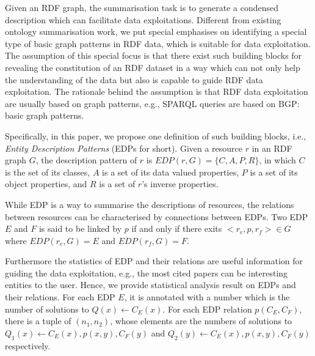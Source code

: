 \vspace{-2mm}
Given an RDF graph, the summarisation task is to generate a condensed description which can facilitate data exploitations. Different from existing ontology summarisation work, we put special emphasises on identifying a special type of basic graph patterns in RDF data, which is suitable for data exploitation.  The assumption of this special focus is that there exist such building blocks for revealing the constitution of an RDF dataset in a way which can not only help the understanding of the data but also is capable to guide RDF data exploitation. The rationale behind the assumption is that RDF data exploitation are usually based on graph patterns, e.g., SPARQL queries are based on BGP: basic  graph patterns.


Specifically, in this paper, we propose one definition of such building blocks, i.e., \emph{Entity Description Patterns} (EDPs for short). Given a resource $r$ in an RDF graph $G$, the description pattern of $r$ is $EDP(r, G)=\{C, A, P, R\}$, in which $C$ is the set of its classes, $A$ is a set of its data valued properties, $P$ is a set of its object properties, and $R$ is a set of $r$\rq{}s inverse properties.

While EDP is a way to summarise the descriptions of resources, the relations between resources can be characterised by connections between EDPs. Two EDP $E$ and $F$ is said to be linked by $p$ if and only if there exits $<r_e, p, r_f> \in G$ where $EDP(r_e, G)=E$ and $EDP(r_f, G)=F$.

Furthermore the statistics of EDP and their relations are useful information for guiding the data exploitation, e.g., the most cited papers can be interesting entities to the user. Hence, we provide statistical analysis result on EDPs and their relations. For each EDP $E$, it is annotated with a number which is the number of solutions to $Q(x) \leftarrow C_E(x)$. For each EDP relation $p(C_E, C_F)$, there is a tuple of $(n_1, n_2)$, whose elements are the numbers of solutions to $Q_1(x) \leftarrow C_E(x), p(x,y), C_F(y)$ and $Q_2(y) \leftarrow C_E(x), p(x,y), C_F(y)$ respectively.